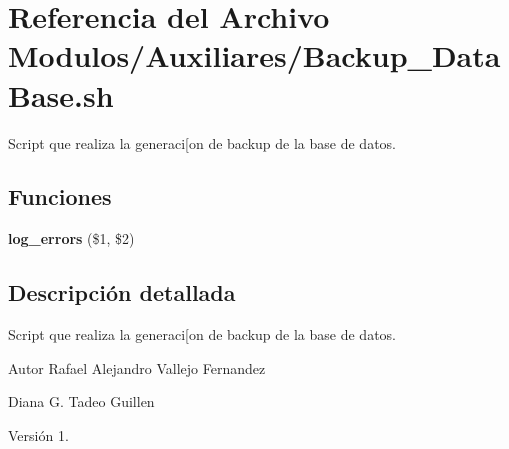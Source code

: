 \hypertarget{Backup__DataBase_8sh}{}\section{Referencia del Archivo Modulos/\+Auxiliares/\+Backup\+\_\+\+Data\+Base.sh}
\label{Backup__DataBase_8sh}


Script que realiza la generaci\mbox{[}on de backup de la base de datos.  


\subsection*{Funciones}
\begin{DoxyCompactItemize}
\item 
\mbox{\label{Backup__DataBase_8sh_a92067b58a8478c9841b2cd9b75ea3565}} 
{\bfseries log\+\_\+errors} (\$1, \$2)
\end{DoxyCompactItemize}


\subsection{Descripción detallada}
Script que realiza la generaci\mbox{[}on de backup de la base de datos. 

\begin{DoxyAuthor}{Autor}
Rafael Alejandro Vallejo Fernandez 

Diana G. Tadeo Guillen 
\end{DoxyAuthor}
\begin{DoxyVersion}{Versión}
1. 
\end{DoxyVersion}
